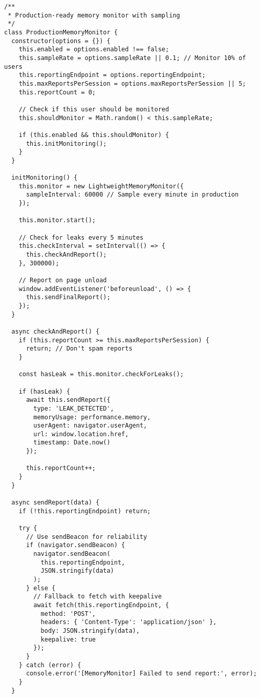 \documentclass[11pt]{article}
\begin{document}
\begin{verbatim}
/**
 * Production-ready memory monitor with sampling
 */
class ProductionMemoryMonitor {
  constructor(options = {}) {
    this.enabled = options.enabled !== false;
    this.sampleRate = options.sampleRate || 0.1; // Monitor 10% of users
    this.reportingEndpoint = options.reportingEndpoint;
    this.maxReportsPerSession = options.maxReportsPerSession || 5;
    this.reportCount = 0;
    
    // Check if this user should be monitored
    this.shouldMonitor = Math.random() < this.sampleRate;
    
    if (this.enabled && this.shouldMonitor) {
      this.initMonitoring();
    }
  }
  
  initMonitoring() {
    this.monitor = new LightweightMemoryMonitor({
      sampleInterval: 60000 // Sample every minute in production
    });
    
    this.monitor.start();
    
    // Check for leaks every 5 minutes
    this.checkInterval = setInterval(() => {
      this.checkAndReport();
    }, 300000);
    
    // Report on page unload
    window.addEventListener('beforeunload', () => {
      this.sendFinalReport();
    });
  }
  
  async checkAndReport() {
    if (this.reportCount >= this.maxReportsPerSession) {
      return; // Don't spam reports
    }
    
    const hasLeak = this.monitor.checkForLeaks();
    
    if (hasLeak) {
      await this.sendReport({
        type: 'LEAK_DETECTED',
        memoryUsage: performance.memory,
        userAgent: navigator.userAgent,
        url: window.location.href,
        timestamp: Date.now()
      });
      
      this.reportCount++;
    }
  }
  
  async sendReport(data) {
    if (!this.reportingEndpoint) return;
    
    try {
      // Use sendBeacon for reliability
      if (navigator.sendBeacon) {
        navigator.sendBeacon(
          this.reportingEndpoint,
          JSON.stringify(data)
        );
      } else {
        // Fallback to fetch with keepalive
        await fetch(this.reportingEndpoint, {
          method: 'POST',
          headers: { 'Content-Type': 'application/json' },
          body: JSON.stringify(data),
          keepalive: true
        });
      }
    } catch (error) {
      console.error('[MemoryMonitor] Failed to send report:', error);
    }
  }
  

\end{verbatim}
\end{document}
